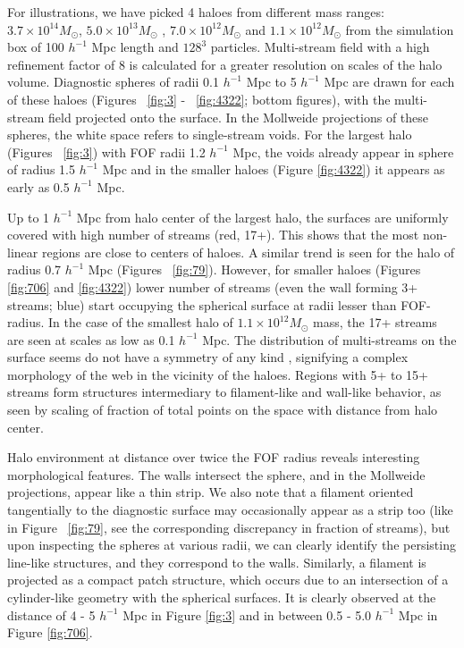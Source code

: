 For illustrations, we have picked 4 haloes from different mass ranges: $3.7 \times 10^{14}M_{\odot} $,  $5.0 \times 10^{13} M_{\odot} $ , $7.0 \times 10^{12} M_{\odot} $ and $1.1 \times 10^{12} M_{\odot} $ from the simulation box of 100 $h^{-1}$ Mpc length and $128^3$ particles. Multi-stream field with a high refinement factor of 8 is calculated for a greater resolution on scales of the halo volume. Diagnostic spheres of radii 0.1 $h^{-1}$ Mpc to 5 $h^{-1}$ Mpc are drawn for each of these haloes (Figures ~\ref{fig:3} - ~\ref{fig:4322}; bottom figures), with the multi-stream field projected onto the surface. In the Mollweide projections of these spheres, the white space refers to single-stream voids. For the largest halo (Figures ~\ref{fig:3}) with FOF radii 1.2 $h^{-1}$ Mpc, the voids already appear in sphere of radius 1.5 $h^{-1}$ Mpc and in the smaller haloes (Figure \ref{fig:4322}) it appears as early as 0.5 $h^{-1}$ Mpc.  

Up to 1 $h^{-1}$ Mpc from halo center of the largest halo, the surfaces are uniformly covered with high number of streams (red, 17+). This shows that the most non-linear regions are close to centers of haloes. A similar trend is seen for the halo of radius 0.7 $h^{-1}$ Mpc (Figures ~\ref{fig:79}). However, for smaller haloes (Figures \ref{fig:706} and \ref{fig:4322}) lower number of streams (even the wall forming 3+ streams; blue) start occupying the spherical surface at radii lesser than FOF-radius. In the case of the smallest halo of $1.1 \times 10^{12} M_{\odot} $ mass, the 17+ streams are seen at scales as low as 0.1 $h^{-1}$ Mpc. The distribution of multi-streams on the surface seems do not have a symmetry of any kind , signifying a complex morphology of the web in the vicinity of the haloes. Regions with 5+ to 15+ streams form structures intermediary to filament-like and wall-like behavior, as seen by scaling of fraction of total points on the space with distance from halo center.

Halo environment at distance over twice the FOF radius reveals interesting morphological features. The walls intersect the sphere, and in the 
Mollweide projections, appear like a thin strip. 
We also note that a filament oriented tangentially to the diagnostic surface may occasionally appear as a strip too (like in Figure ~\ref{fig:79}, 
see the corresponding discrepancy in fraction of streams), but upon inspecting the spheres at various radii, we can clearly identify the persisting line-like structures, and they correspond to the walls. Similarly, a filament is projected as a compact patch structure, which occurs due to an intersection of a cylinder-like geometry with the spherical surfaces. It is clearly observed at the distance of 4 - 5 $h^{-1}$ Mpc in Figure \ref{fig:3} and in between 0.5 - 5.0 $h^{-1}$ Mpc in Figure \ref{fig:706}.
	
